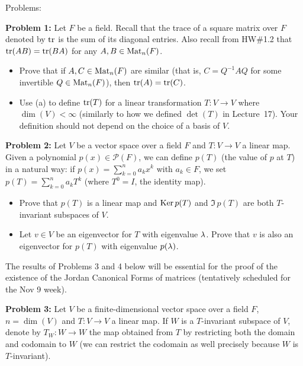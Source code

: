 \documentclass[11pt]{amsart}
\begin{document}
\bf\centerline{Problems: }\rm
\skv
{\bf Problem 1:} Let $F$ be a field.
Recall that the trace of a square matrix over $F$ denoted by ${\rm tr}$ is the sum of its diagonal entries.
Also recall from HW\#1.2 that ${\rm tr}(AB)={\rm tr}(BA)$ for any $A,B\in {\rm Mat}_{n}(F)$. 
\begin{itemize}
\item[(a)] Prove that if $A,C\in {\rm Mat}_{n}(F)$ are similar (that is, $C=Q^{-1}AQ$ for some
invertible $Q\in {\rm Mat}_{n}(F)$), then ${\rm tr}(A)={\rm tr}(C)$.
\item[(b)] Use (a) to define ${\rm tr}(T)$ for a linear transformation $T:V\to V$ where $\dim(V)<\infty$
(similarly to how we defined $\det(T)$ in Lecture~17). Your definition should not depend on the choice of a basis of $V$.
\end{itemize}
\skv
{\bf Problem 2:} Let $V$ be a vector space over a field $F$ and $T:V\to V$ a linear map. Given a polynomial $p(x)\in\mathcal{P}(F)$,
we can define $p(T)$ (the value of $p$ at $T$) in a natural way: if $p(x)=\sum\limits_{k=0}^n a_k x^k$ with $a_k\in F$,
we set $p(T)=\sum\limits_{k=0}^n a_k T^k$ (where $T^0=I$, the identity map). 
\begin{itemize}
\item[(a)] Prove that $p(T)$ is a linear map and ${\rm Ker}\, p(T)$ and $\Im\, p(T)$ are both $T$-invariant subspaces of $V$.
\item[(b)] Let $v\in V$ be an eigenvector for $T$ with eigenvalue ${\lambda}$. Prove that $v$ is also an eigenvector for $p(T)$
with eigenvalue $p({\lambda})$.
\end{itemize}
\skv
The results of Problems 3 and 4 below will be essential for the proof of the existence of the Jordan Canonical Forms of matrices
(tentatively scheduled for the Nov 9 week). 

\skv
{\bf Problem 3:} Let $V$ be a finite-dimensional vector space over a field $F$, $n=\dim(V)$ and $T:V\to V$ a linear map.
If $W$ is a $T$-invariant subspace of $V$, denote by $T_W: W\to W$ the map obtained from $T$ by restricting both the domain
and codomain to $W$ (we can restrict the codomain as well precisely because $W$ is $T$-invariant). 
\end{document}
